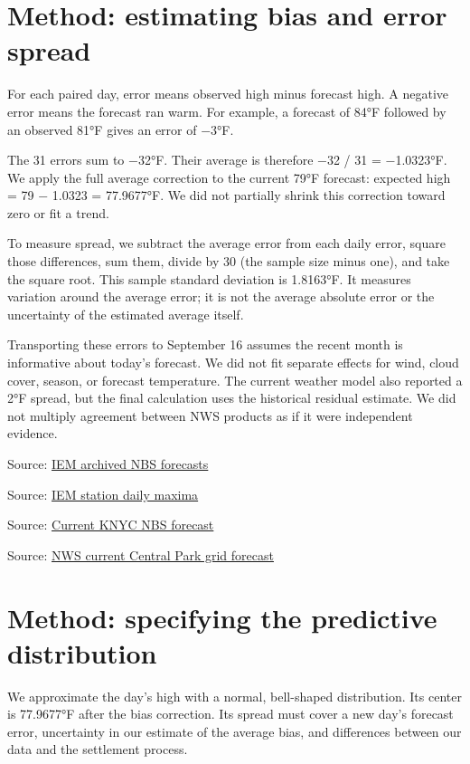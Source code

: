\documentclass[11pt]{article}
\begin{document}
\section*{\textcolor{epdarkgreen}{Method: estimating bias and error spread}}
For each paired day, error means observed high minus forecast high. A negative error means the forecast ran warm. For example, a forecast of 84°F followed by an observed 81°F gives an error of −3°F.


The 31 errors sum to −32°F. Their average is therefore −32 / 31 = −1.0323°F. We apply the full average correction to the current 79°F forecast: expected high = 79 − 1.0323 = 77.9677°F. We did not partially shrink this correction toward zero or fit a trend.


To measure spread, we subtract the average error from each daily error, square those differences, sum them, divide by 30 (the sample size minus one), and take the square root. This sample standard deviation is 1.8163°F. It measures variation around the average error; it is not the average absolute error or the uncertainty of the estimated average itself.


Transporting these errors to September 16 assumes the recent month is informative about today’s forecast. We did not fit separate effects for wind, cloud cover, season, or forecast temperature. The current weather model also reported a 2°F spread, but the final calculation uses the historical residual estimate. We did not multiply agreement between NWS products as if it were independent evidence.


\par{\small Source: \href{https://mesonet.agron.iastate.edu/cgi-bin/request/mos.py?station=KNYC\&model=NBS\&sts=2026-08-16T00\%3A00Z\&ets=2026-09-16T00\%3A00Z\&format=csv}{IEM archived NBS forecasts}}
\par{\small Source: \href{https://mesonet.agron.iastate.edu/cgi-bin/request/daily.py?sts=2026-08-16\&ets=2026-09-15\&network=NY\_ASOS\&stations=NYC\&var=max\_temp\_f\&format=csv}{IEM station daily maxima}}
\par{\small Source: \href{https://mesonet.agron.iastate.edu/api/1/mos.json?station=KNYC\&model=NBS\&runtime=2026-09-16T06\%3A00Z}{Current KNYC NBS forecast}}
\par{\small Source: \href{https://api.weather.gov/gridpoints/OKX/34,45/forecast}{NWS current Central Park grid forecast}}
\section*{\textcolor{epdarkgreen}{Method: specifying the predictive distribution}}
We approximate the day’s high with a normal, bell-shaped distribution. Its center is 77.9677°F after the bias correction. Its spread must cover a new day’s forecast error, uncertainty in our estimate of the average bias, and differences between our data and the settlement process.
\end{document}
